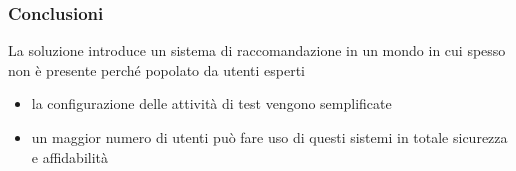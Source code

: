 \begin{frame}
    \frametitle{Conclusioni}
    La soluzione introduce un sistema di raccomandazione in un mondo in cui spesso non è presente perché 
    popolato da utenti esperti
    \begin{itemize}
        \item la configurazione delle attività di test vengono semplificate
        \item un maggior numero di utenti può fare uso di questi sistemi in totale sicurezza e affidabilità
    \end{itemize}
\end{frame}
